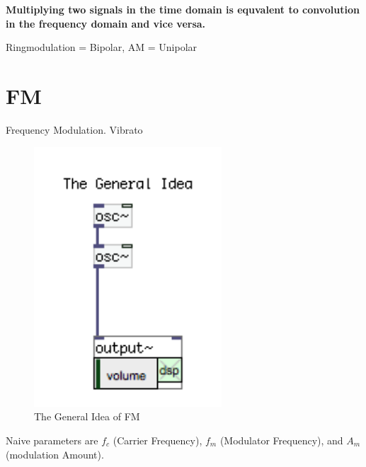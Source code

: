 \textbf{Multiplying two signals in the time domain is equvalent to convolution in the frequency domain and vice versa.
}

Ringmodulation = Bipolar,
AM = Unipolar

\section{FM} %
\label{sub:FM}

Frequency Modulation. \glqq{}Vibrato\grqq{}


\begin{figure}[H]
	\begin{center}
		\includegraphics[width = 7cm]{img/FMgeneral.png}
		\caption{The General Idea of FM}
		\label{fig:fmIdea}
	\end{center}
\end{figure}

Naive parameters are ${f_c}$ (Carrier Frequency), ${f_m}$ (Modulator Frequency), and ${A_m}$ (modulation Amount).


